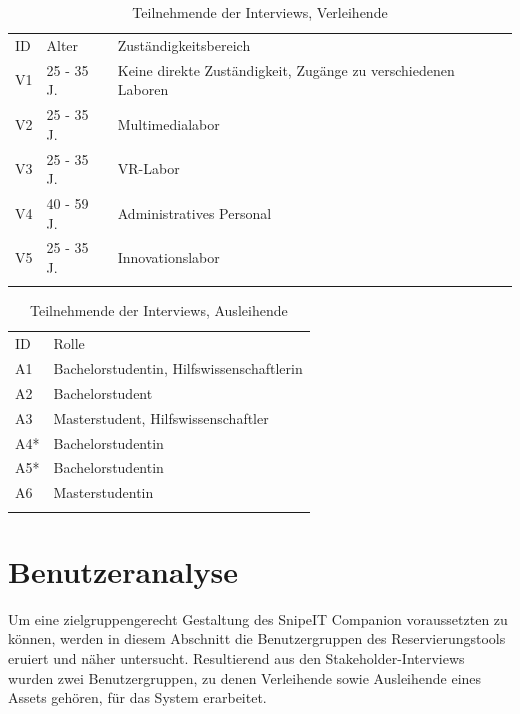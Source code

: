 \begin{table}[h]
    \centering
    \caption{Teilnehmende der Interviews, Verleihende}
    \begin{tabular}{lll}
        \arrayrulecolor{maincolor}\hline
        \sffamily\color{maincolor}ID & \sffamily\color{maincolor}Alter &
        \sffamily\color{maincolor}Zuständigkeitsbereich \\
        \arrayrulecolor{maincolor}\hline
            V1 & 25 - 35 J. & Keine direkte Zuständigkeit, Zugänge zu verschiedenen Laboren\\
            V2 & 25 - 35 J. & Multimedialabor\\
            V3 & 25 - 35 J. & VR-Labor\\
            V4 & 40 - 59 J. & Administratives Personal\\
            V5 & 25 - 35 J. & Innovationslabor\\
            \arrayrulecolor{maincolor}\hline
    \end{tabular}  
    \label{table:v}
\end{table}

\begin{table}[h]
    \centering 
    \caption{Teilnehmende der Interviews, Ausleihende}
    \begin{tabular}{ll}
        \arrayrulecolor{maincolor}\hline
        \sffamily\color{maincolor}ID & \sffamily\color{maincolor}Rolle \\
        \arrayrulecolor{maincolor}\hline
            A1  & Bachelorstudentin, Hilfswissenschaftlerin\\
            A2 &  Bachelorstudent\\
            A3  & Masterstudent, Hilfswissenschaftler \\
            A4*  & Bachelorstudentin \\
            A5*  & Bachelorstudentin \\
            A6  & Masterstudentin \\
        \arrayrulecolor{maincolor}\hline
    \end{tabular}
    \label{table:a}
\end{table}

\section{Benutzeranalyse}
\label{section:benutzer}
Um eine zielgruppengerecht Gestaltung des SnipeIT Companion voraussetzten zu können, werden
in diesem Abschnitt die Benutzergruppen des Reservierungstools eruiert und näher untersucht.
Resultierend aus den Stakeholder-Interviews wurden zwei Benutzergruppen, zu denen Verleihende sowie 
Ausleihende eines Assets gehören, für das System erarbeitet.

